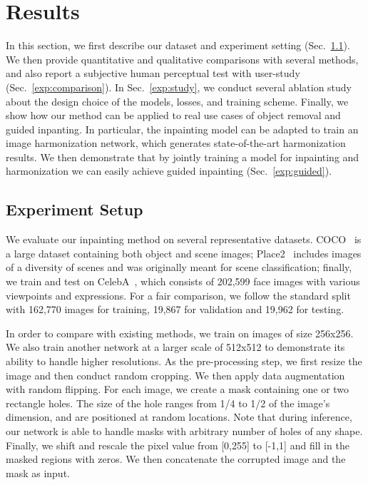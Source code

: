 \section{Results}
\label{sec:results}
In this section, we first describe our dataset and experiment setting (Sec.~\ref{exp:setup}). We then provide quantitative and qualitative comparisons with several methods, and also report a subjective human perceptual test with user-study (Sec.~\ref{exp:comparison}). In Sec.~\ref{exp:study}, we conduct several ablation study about the design choice of the models, losses, and training scheme. Finally, we show how our method can be applied to real use cases of object removal and guided inpanting. In particular, the inpainting model can be adapted to train an image harmonization network, which generates state-of-the-art harmonization results. We then demonstrate that by jointly training a model for inpainting and harmonization we can easily achieve guided inpainting (Sec.~\ref{exp:guided}).

\subsection{Experiment Setup}
\label{exp:setup}
We evaluate our inpainting method on several representative datasets. COCO~\cite{lin2014microsoft} is a large dataset containing both object and scene images; Place2~\cite{zhou2016places} includes images of a diversity of scenes and was originally meant for scene classification; finally, we train and test on CelebA~\cite{liu2015faceattributes}, which consists of 202,599 face images with various viewpoints and expressions. For a fair comparison, we follow the standard split with 162,770 images for training, 19,867 for validation and 19,962 for testing.

In order to compare with existing methods, we train on images of size 256x256. We also train another network at a larger scale of 512x512 to demonstrate its ability to handle higher resolutions. As the pre-processing step, we first resize the image and then conduct random cropping. We then apply data augmentation with random flipping. For each image, we create a mask containing one or two rectangle holes. The size of the hole ranges from 1/4 to 1/2 of the image's dimension, and are positioned at random locations. Note that during inference, our network is able to handle masks with arbitrary number of holes of any shape. Finally, we shift and rescale the pixel value from [0,255] to [-1,1] and fill in the masked regions with zeros. We then concatenate the corrupted image and the mask as input.

